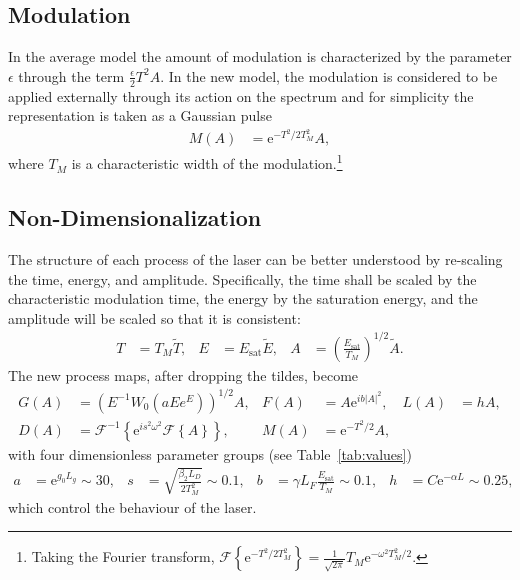 \documentclass[12pt]{article}
\newcommand{\Es}{E_{\textrm{sat}}}
\newcommand{\FT}[1]{\mathcal{F}\left\{ #1 \right\}}
\newcommand{\FTi}[1]{\mathcal{F}^{-1}\left\{ #1 \right\}}
\begin{document}
\subsection{Modulation}
In the average model the amount of modulation is characterized by the parameter $\epsilon$ through
the term $\frac{\epsilon}{2}T^2 A$.  In the new model, the modulation is considered to be applied
externally through its action on the spectrum and for simplicity the representation is taken as a
Gaussian pulse  
\begin{align}
	M(A) &= \textrm{e}^{-T^2 / 2 T_M^2} A,
\end{align}
where $T_M$ is a characteristic width of the modulation.\footnote{Taking the Fourier transform, 
$\FT{\textrm{e}^{-T^2/ 2 T_M^2}} = \frac{1}{\sqrt{2\pi}}T_M\textrm{e}^{-\omega^2T_M^2/2}$.}



\subsection{Non-Dimensionalization}
The structure of each process of the laser can be better understood by re-scaling the time, energy, and amplitude. Specifically, the time shall be scaled by the characteristic modulation time, the energy by the saturation energy, and the amplitude will be scaled so that it is consistent:
\begin{align*}
	T &= T_M \widetilde{T},& E &= \Es \widetilde{E},& A &= \left( \frac{\Es}{T_M} \right)^{1/2} \widetilde{A}.
\end{align*}
The new process maps, after dropping the tildes, become
\begin{align*}
	G(A) &= \left(E^{-1} W_0 \left( a E e^{E}\right) \right)^{1/2} A,&
	F(A) &= A \textrm{e}^{i b |A|^2},&
	L(A) &= h A,\\
	D(A) &= \FTi{\textrm{e}^{i s^2 \omega^2} \FT{A}},&
	M(A) &= \textrm{e}^{-T^2 / 2} A,
\end{align*}
with four dimensionless parameter groups (see Table~\ref{tab:values})
\begin{align*}
	a &= \textrm{e}^{g_0 L_g} \sim 30,& s &= \sqrt{\frac{\beta_2 L_D}{2 T_M^2}} \sim 0.1,&
	b &= \gamma L_F \frac{\Es}{T_M} \sim 0.1,& h &= C \textrm{e}^{-\alpha L} \sim 0.25,
\end{align*}
which control the behaviour of the laser.
\end{document}
